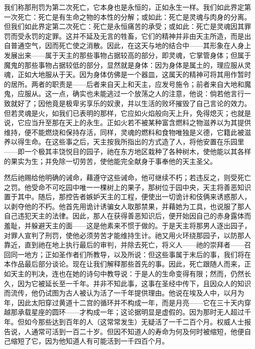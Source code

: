我们称那刑罚为第二次死亡，它本身也是永恒的，正如永生一样。我们如此界定第一次死亡：死亡是有生命之物的本性的分解；或如此：死亡是灵魂与肉身的分离。但我们如此界定第二次死亡：死亡是永恒痛苦的承受；或如此：死亡是灵魂因其罪罚而受永罚的定罪。这并不延及无言的牲畜，它们的精神并非由天主所造，而是出自普通空气，因而死亡使之消散。因此，在这天与地的结合中——其形象在人身上发展出来——属于天主的那些事物占据较高的部分，即灵魂，它掌管身体；但属于魔鬼的那些事物占据较低的部分，显然就是身体：因为身体是属土的，理应服从灵魂，正如大地服从于天。因为身体仿佛是一个器皿，这属天的精神可将其用作暂时的居所。两者的职责是——后者来自天上和天主，应发号施令；前者来自大地和魔鬼，应服从。这一点，确实也未能逃过一个放荡之人的注意，他说：倘若他言行一致就好了；因他竟是极卑劣享乐的奴隶，并以生活的败坏摧毁了自己言论的效力。但若灵魂是火，如我们已表明的那样，它应如火焰般向天上升，免得熄灭；也就是说，它应当升至那在天上的永生。正如火若不被某种富含燃料之物滋养以为其提供维持，便不能燃烧和保持存活，同样，灵魂的燃料和食物唯独是义德，它籍此被滋养以得生命。在这些事之后，天主按我所指出的方式造了人，将他安置在乐园里——即一个极其丰饶悦目的园子，祂在东方地区栽种了各种树木，使他能以其各样的果实为生；并免除一切劳苦，使他能完全献身于事奉他的天主圣父。\par

然后祂赐给他明确的诫命，藉遵守这些诫命，他可继续不朽；若违反之，则受死亡之罚。他受命不可吃园中唯一一棵树上的果子，那树位于园中央，天主将善恶知识置于其中。随后，那控告者嫉妒天主的工程，便使出一切诡计和伎俩来诱惑那人，以剥夺他的不朽。他首先用诡计诱骗女人取那禁果，并藉她为工具，也说服了那人自己违犯天主的法律。因此，那人在获得善恶知识后，便开始因自己的赤身露体而羞耻，并躲避天主的面——这是他素来不惯于做的。于是天主将那男人逐出园子，对罪人宣判了刑罚，使他必须劳苦才能维持生计。祂又用火环绕那园子，以防那人靠近，直到祂在地上执行最后的审判，并除去死亡，将义人——祂的崇拜者——召回同一地方；正如圣作者们所教导，以及所说：但这些事属于末后的事，我们将在本作品最后部分谈论。现在让我们解释那些首先的事。因此，死亡跟随人而来，正如天主的判决，连也在她的诗句中教导说：于是人的生命变得有限；然而，仍然长久，因为它被延长至一千年。并非不知此事，这事在圣经中传下，且因众人的知识而流传，他仍试图为古人被认为活了一千年提供理由。他说在埃及人中，以月为年，因此太阳穿过黄道十二宫的循环并不构成一年，而是月亮——它在三十天内穿越那承载星座的圆环——才构成一年；这论据明显是虚假的。因为那时无人超过千年。但如今那些达到百年的人（这常常发生）无疑活了一千二百个月。权威人士报告说，人通常可活到一百二十岁。但因不知道人的寿命为何及何时被缩短，他便自己缩短了它，因为他知道人有可能活到一千四百个月。\par


